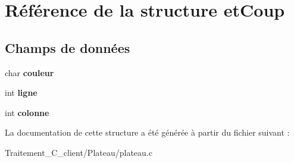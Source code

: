 \hypertarget{structet_coup}{}\section{Référence de la structure et\+Coup}
\label{structet_coup}
\subsection*{Champs de données}
\begin{DoxyCompactItemize}
\item 
char {\bfseries couleur}\hypertarget{structet_coup_a7d939a822f708b17b81e028a43f4594e}{}\label{structet_coup_a7d939a822f708b17b81e028a43f4594e}

\item 
int {\bfseries ligne}\hypertarget{structet_coup_a66af32d3d7b5e0efd6db373c0813e7dd}{}\label{structet_coup_a66af32d3d7b5e0efd6db373c0813e7dd}

\item 
int {\bfseries colonne}\hypertarget{structet_coup_a733a251be89c7decb13f4fb7b413c82d}{}\label{structet_coup_a733a251be89c7decb13f4fb7b413c82d}

\end{DoxyCompactItemize}


La documentation de cette structure a été générée à partir du fichier suivant \+:\begin{DoxyCompactItemize}
\item 
Traitement\+\_\+\+C\+\_\+client/\+Plateau/plateau.\+c\end{DoxyCompactItemize}
